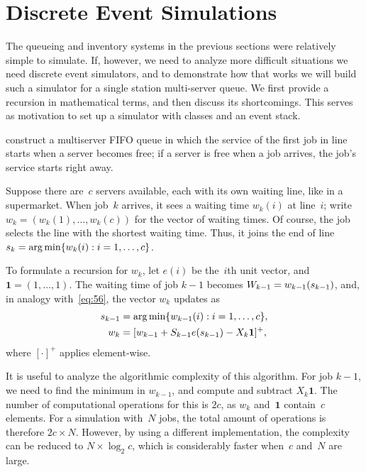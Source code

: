 \documentclass[queueing-book.tex]{subfiles}
\begin{document}
\section{Discrete Event Simulations}
\label{sec:discr-event-simul}



The queueing and inventory systems in the previous sections were relatively simple to simulate.
If, however, we need to analyze more difficult situations we need discrete event simulators, and to demonstrate how that works we will build such a simulator for a single station multi-server queue.
We first provide a recursion in mathematical terms, and then discuss its shortcomings.
This serves as motivation to set up a simulator with classes and an event stack.



 construct a multiserver FIFO queue in which the service of the first job in line starts when a server becomes free; if a server is free when a job arrives, the job's service  starts right away.

Suppose there are~$c$ servers available, each with its own waiting line, like in a supermarket.
When job~$k$ arrives, it sees a waiting time $w_{k}(i)$ at line~$i$; write $w_k = (w_{k}(1), \ldots, w_{k}(c))$ for the vector of waiting times.
Of course, the job selects the line with the shortest waiting time.
Thus, it joins the end of line $s_k = \operatorname*{arg\,min}\{w_{k}(i) : i=1,\ldots, c\}$.

To formulate a recursion for $w_{k}$, let $e(i)$ be the~$i$th unit vector, and $\mathbf{1} = (1,\ldots, 1)$.
The waiting time of job $k-1$ becomes $W_{k-1} = w_{k-1}(s_{k-1})$, and, in analogy with~\cref{eq:56}, the vector $w_k$ updates as
\begin{align*}
  s_{k-1} &= \operatorname*{arg\,min}\{w_{k-1}(i) : i=1,\ldots, c\},\\
  w_{k} &= [w_{k-1} + S_{k-1} e(s_{k-1}) - X_{k}\mathbf{1}]^+,
\end{align*}
where $[\cdot]^+$ applies element-wise.


It is useful to analyze the algorithmic complexity of this algorithm.
For job $k-1$, we need to find the minimum in $w_{k-1}$, and compute and subtract $X_{k}\mathbf{1}$.
The number of computational operations for this is $2c$, as $w_k$ and~$\mathbf{1}$ contain~$c$ elements.
For a simulation with~$N$ jobs, the total amount of operations is therefore $2c \times N$.
However, by using a different implementation, the complexity can be reduced to $N\times \log_2{c}$, which is considerably faster when~$c$ and~$N$ are large.
\end{document}

